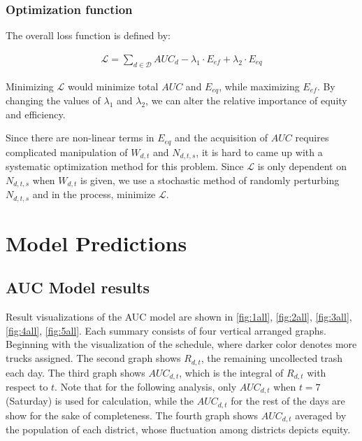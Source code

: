 \documentclass{article}
\begin{document}

\subsubsection{Optimization function}

The overall loss function is defined by:

\begin{align}
    \mathcal{L} = \sum_{d \in \mathcal{D}} AUC_d - \lambda_1 \cdot E_{ef} + \lambda_2 \cdot E_{eq}
\end{align}

Minimizing $\mathcal{L}$ would minimize total $AUC$ and $E_{eq}$, while maximizing $E_{ef}$. By changing the values of $\lambda_1$ and $\lambda_2$, we can alter the relative importance of equity and efficiency.

Since there are non-linear terms in $E_{eq}$ and the acquisition of $AUC$ requires complicated manipulation of $W_{d,t} $ and $ N_{d,t,s}$, it is hard to came up with a systematic optimization method for this problem. Since $\mathcal{L}$ is only dependent on $N_{d,t,s}$ when $W_{d,t}$ is given, we use a stochastic method of randomly perturbing $N_{d,t,s}$ and in the process, minimize $\mathcal{L}$.

\section{Model Predictions}

\subsection{AUC Model results}

Result visualizations of the AUC model are shown in \cref{fig:1all}, \cref{fig:2all}, \cref{fig:3all}, \cref{fig:4all}, \cref{fig:5all}. Each summary consists of four vertical arranged graphs. Beginning with the visualization of the schedule, where darker color denotes more trucks assigned. The second graph shows $R_{d,t}$, the remaining uncollected trash each day. The third graph shows $AUC_{d,t}$, which is the integral of $R_{d,t}$ with respect to $t$. Note that for the following analysis, only $AUC_{d,t}$ when $t = 7$ (Saturday) is used for calculation, while the $AUC_{d,t}$ for the rest of the days are show for the sake of completeness. The fourth graph shows $AUC_{d,t}$ averaged by the population of each district, whose fluctuation among districts depicts equity.
\end{document}
